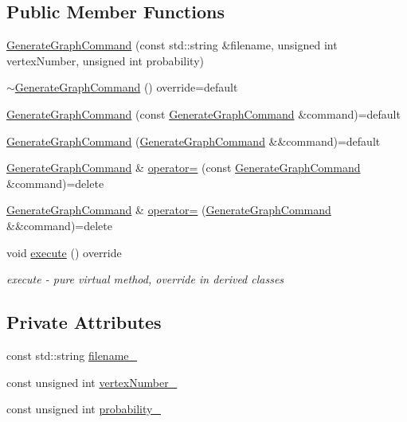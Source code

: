 \subsection*{Public Member Functions}
\begin{DoxyCompactItemize}
\item 
\hyperlink{a00006_ad023d97ba753b8ccc81548dec2874d16_ad023d97ba753b8ccc81548dec2874d16}{Generate\+Graph\+Command} (const std\+::string \&filename, unsigned int vertex\+Number, unsigned int probability)
\item 
\hyperlink{a00006_a15521f939e551a1f8a02e0051cad75e6_a15521f939e551a1f8a02e0051cad75e6}{$\sim$\+Generate\+Graph\+Command} () override=default
\item 
\hyperlink{a00006_ac6c083c3a1125922bece382628be07b4_ac6c083c3a1125922bece382628be07b4}{Generate\+Graph\+Command} (const \hyperlink{a00006}{Generate\+Graph\+Command} \&command)=default
\item 
\hyperlink{a00006_a5413de4b4729b780acb8219a72940535_a5413de4b4729b780acb8219a72940535}{Generate\+Graph\+Command} (\hyperlink{a00006}{Generate\+Graph\+Command} \&\&command)=default
\item 
\hyperlink{a00006}{Generate\+Graph\+Command} \& \hyperlink{a00006_a0c20d65ffe490778db13d9b02c8a93f3_a0c20d65ffe490778db13d9b02c8a93f3}{operator=} (const \hyperlink{a00006}{Generate\+Graph\+Command} \&command)=delete
\item 
\hyperlink{a00006}{Generate\+Graph\+Command} \& \hyperlink{a00006_a78458bc559961c2cc08a64882fdd5261_a78458bc559961c2cc08a64882fdd5261}{operator=} (\hyperlink{a00006}{Generate\+Graph\+Command} \&\&command)=delete
\item 
void \hyperlink{a00006_ab12982f085f5974e6922aca8959400af_ab12982f085f5974e6922aca8959400af}{execute} () override
\begin{DoxyCompactList}\small\item\em execute -\/ pure virtual method, override in derived classes \end{DoxyCompactList}\end{DoxyCompactItemize}
\subsection*{Private Attributes}
\begin{DoxyCompactItemize}
\item 
const std\+::string \hyperlink{a00006_aa8a646c7d25122a9f46e7781997e1241_aa8a646c7d25122a9f46e7781997e1241}{filename\+\_\+}
\item 
const unsigned int \hyperlink{a00006_abe00a97efbb0dc5b24c4736e2381cfc0_abe00a97efbb0dc5b24c4736e2381cfc0}{vertex\+Number\+\_\+}
\item 
const unsigned int \hyperlink{a00006_a48a02d76a585abe00fdedcaf5c392f32_a48a02d76a585abe00fdedcaf5c392f32}{probability\+\_\+}
\end{DoxyCompactItemize}


